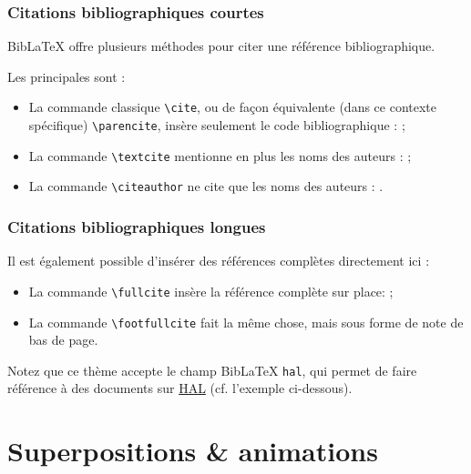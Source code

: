 \documentclass[10pt,    %
    french,             %
    xcolor=table,       %
    envcountsect,       %
    aspectratio=43      %
]{beamer}
\begin{document}
\begin{frame}
    \frametitle{Citations bibliographiques courtes} 
    
    BibLaTeX offre plusieurs méthodes pour citer une référence bibliographique. 
    
    Les principales sont :
    \begin{itemize}
        \item La commande classique \texttt{\textbackslash{}cite}, ou de façon équivalente (dans ce contexte spécifique) \texttt{\textbackslash{}parencite}, insère seulement le code bibliographique : \cite{Cossu2016} ;
        \item La commande \texttt{\textbackslash{}textcite} mentionne en plus les noms des auteurs : \textcite{Cossu2016} ;
        \item La commande \texttt{\textbackslash{}citeauthor} ne cite que les noms des auteurs : \citeauthor{Cossu2016}.
    \end{itemize}
\end{frame}

\begin{frame}
    \frametitle{Citations bibliographiques longues} 
    
    Il est également possible d'insérer des références complètes directement ici :
    \begin{itemize}
        \item La commande \texttt{\textbackslash{}fullcite} insère la référence complète sur place:  ;
        \item La commande \texttt{\textbackslash{}footfullcite} fait la même chose, mais sous forme de note de bas de page.
    \end{itemize}
    
    Notez que ce thème accepte le champ BibLaTeX \texttt{hal}, qui permet de faire référence à des documents sur \href{https://hal.archives-ouvertes.fr/}{HAL} (cf. l'exemple ci-dessous).
\end{frame}










\section{Superpositions \& animations}
\label{sec:animations}
\sectionframe
\end{document}
